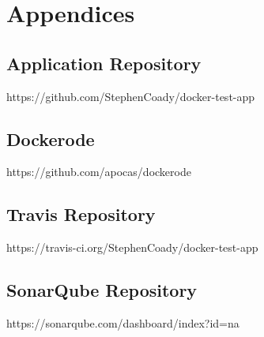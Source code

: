 \documentclass{article}
\begin{document}
\onehalfspacing
\hypersetup{pageanchor=false}

\hypersetup{pageanchor=true}
\newpage
\tableofcontents

\newpage
\printglossaries

\newpage


\newpage


\newpage


\newpage


\newpage


\newpage


\newpage


\newpage
\appendix
\section*{Appendices}
\renewcommand{\thesubsection}{\Alph{subsection}}

\subsection{Application Repository}
\label{appendix:code}
https://github.com/StephenCoady/docker-test-app

\subsection{Dockerode} 
\label{appendix:dockerode_appendix}
https://github.com/apocas/dockerode

\subsection{Travis Repository} 
\label{appendix:travis}
https://travis-ci.org/StephenCoady/docker-test-app

\subsection{SonarQube Repository} 
\label{appendix:sonarqube}
https://sonarqube.com/dashboard/index?id=na

\newpage

\end{document}
